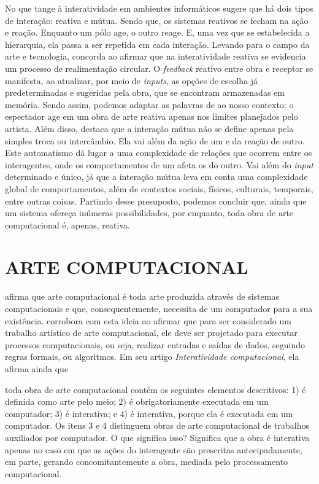 No que tange à interatividade em ambientes informáticos  sugere que há dois tipos de interação: reativa e mútua. Sendo que,  os sistemas reativos se fecham na ação e reação. Enquanto um pólo age, o outro reage. E, uma vez que se estabelecida a hierarquia, ela passa a ser repetida em cada interação. Levando para o campo da arte e tecnologia,  concorda ao afirmar que na interatividade reativa se evidencia um processo de realimentação circular. O \textit{feedback} reativo entre obra e receptor se manifesta, ao atualizar, por meio de \textit{inputs}, as opções de escolha já predeterminadas e sugeridas pela obra, que se encontram armazenadas em memória. Sendo assim, podemos adaptar as palavras de  ao nosso contexto: o espectador age em um obra de arte reativa apenas nos limites planejados pelo artista. Além disso,  destaca que a interação mútua não se define apenas pela simples troca ou intercâmbio. Ela vai além da ação de um e da reação de outro. Este automatismo dá lugar a uma complexidade de relações que ocorrem entre os interagentes, onde os comportamentos de um afeta os do outro. Vai além do \textit{input} determinado e único, já que a interação mútua leva em conta uma complexidade global de comportamentos, além de contextos sociais, físicos, culturais, temporais, entre outras coisas. Partindo desse presuposto, podemos concluir que, ainda que um sistema ofereça inúmeras possibilidades, por enquanto, toda obra de arte computacional é, apenas, reativa.


\section{ARTE COMPUTACIONAL}

 afirma que arte computacional é toda arte produzida através de sistemas  computacionais e que, consequentemente, necessita de um computador para a sua existência.  corrobora com esta ideia ao afirmar que para ser considerado um trabalho artístico de arte computacional, ele deve ser projetado para executar processos computacionais, ou seja, realizar entradas e saídas de dados, seguindo regras formais, ou algoritmos. Em seu artigo \textit{Interatividade computacional}, ela afirma ainda que

\begin{citacao}
toda obra de arte computacional contém os seguintes elementos descritivos: 1) é definida como arte pelo meio; 2) é obrigatoriamente executada em um computador; 3) é interativa; e 4) é interativa, porque ela é executada em um computador. Os itens 3 e 4 distinguem obras de arte computacional de trabalhos auxiliados por computador. O que significa isso? Significa que a obra é interativa apenas no caso em que as ações do interagente são prescritas antecipadamente, em parte, gerando concomitantemente a obra, mediada pelo processamento computacional.  \cite[p. 133]{venturelli}
\end{citacao}

